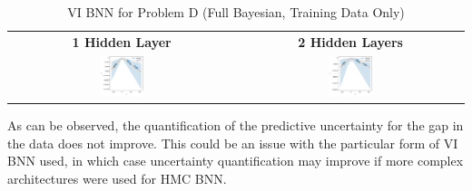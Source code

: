 \documentclass[conference]{IEEEtran}
\begin{document}
\begin{table}[H]
\centering
\begin{tabular}{cc}
\textbf{1 Hidden Layer} & \textbf{2 Hidden Layers}\\
\includegraphics[width=0.2\textwidth]{images/vi_bnn--problem_D--sb--full_bayesian.png} & \includegraphics[width=0.2\textwidth]{images/vi_bnn--problem_D--sb--full_bayesian--2_hidden_layers.png}
\end{tabular}
\caption{VI BNN for Problem D (Full Bayesian, Training Data Only)}
\label{tb4:table_of_figures}
\end{table}

As can be observed, the quantification of the predictive uncertainty for the gap in the data does not improve. This could be an issue with the particular form of VI BNN used, in which case uncertainty quantification may improve if more complex architectures were used for HMC BNN.
\end{document}
